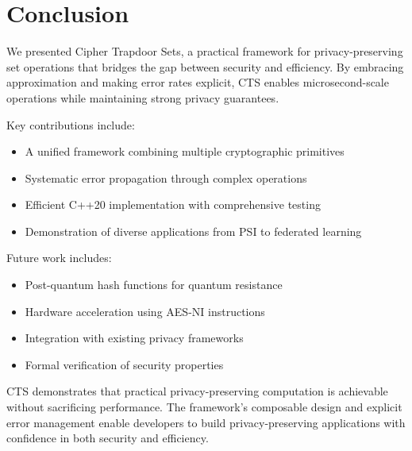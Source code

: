 \documentclass[10pt,conference]{IEEEtran}
\begin{document}
\section{Conclusion}
\label{sec:conclusion}

We presented Cipher Trapdoor Sets, a practical framework for privacy-preserving set operations that bridges the gap between security and efficiency. By embracing approximation and making error rates explicit, CTS enables microsecond-scale operations while maintaining strong privacy guarantees.

Key contributions include:
\begin{itemize}
\item A unified framework combining multiple cryptographic primitives
\item Systematic error propagation through complex operations
\item Efficient C++20 implementation with comprehensive testing
\item Demonstration of diverse applications from PSI to federated learning
\end{itemize}

Future work includes:
\begin{itemize}
\item Post-quantum hash functions for quantum resistance
\item Hardware acceleration using AES-NI instructions
\item Integration with existing privacy frameworks
\item Formal verification of security properties
\end{itemize}

CTS demonstrates that practical privacy-preserving computation is achievable without sacrificing performance. The framework's composable design and explicit error management enable developers to build privacy-preserving applications with confidence in both security and efficiency.



\end{document}
